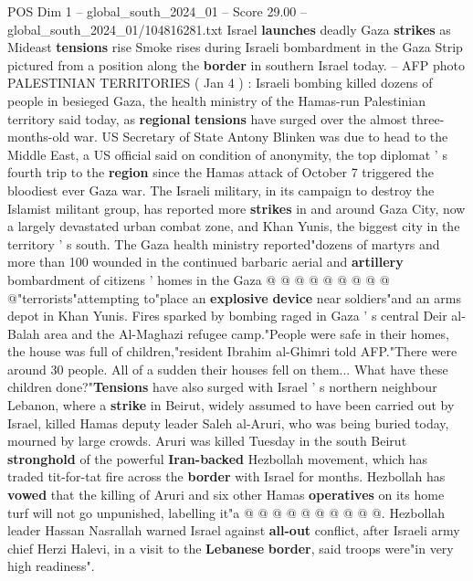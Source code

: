 \begin{textsample}{POS Dim 1 – global\_south\_2024\_01 – Score 29.00 – global\_south\_2024\_01/104816281.txt}  \label{ex:f1_pos_102}
Israel \textbf{launches} deadly Gaza \textbf{strikes} as Mideast \textbf{tensions} rise Smoke rises during Israeli bombardment in the Gaza Strip pictured from a position along the \textbf{border} in southern Israel today. -- AFP photo PALESTINIAN TERRITORIES ( Jan 4 ) : Israeli bombing killed dozens of people in besieged Gaza, the health ministry of the Hamas-run Palestinian territory said today, as \textbf{regional} \textbf{tensions} have surged over the almost three-months-old war.
US Secretary of State Antony Blinken was due to head to the Middle East, a US official said on condition of anonymity, the top diplomat ' s fourth trip to the \textbf{region} since the Hamas attack of October 7 triggered the bloodiest ever Gaza war.
The Israeli military, in its campaign to destroy the Islamist militant group, has reported more \textbf{strikes} in and around Gaza City, now a largely devastated urban combat zone, and Khan Yunis, the biggest city in the territory ' s south.
The Gaza health ministry reported"dozens of martyrs and more than 100 wounded in the continued barbaric aerial and \textbf{artillery} bombardment of citizens ' homes in the Gaza @ @ @ @ @ @ @ @ @ @"terrorists"attempting to"place an \textbf{explosive} \textbf{device} near soldiers"and an arms depot in Khan Yunis.
Fires sparked by bombing raged in Gaza ' s central Deir al-Balah area and the Al-Maghazi refugee camp."People were safe in their homes, the house was full of children,"resident Ibrahim al-Ghimri told AFP."There were around 30 people.
All of a sudden their houses fell on them...
What have these children done?"\textbf{Tensions} have also surged with Israel ' s northern neighbour Lebanon, where a \textbf{strike} in Beirut, widely assumed to have been carried out by Israel, killed Hamas deputy leader Saleh al-Aruri, who was being buried today, mourned by large crowds.
Aruri was killed Tuesday in the south Beirut \textbf{stronghold} of the powerful \textbf{Iran-backed} Hezbollah movement, which has traded tit-for-tat fire across the \textbf{border} with Israel for months.
Hezbollah has \textbf{vowed} that the killing of Aruri and six other Hamas \textbf{operatives} on its home turf will not go unpunished, labelling it"a @ @ @ @ @ @ @ @ @ @.
Hezbollah leader Hassan Nasrallah warned Israel against \textbf{all-out} conflict, after Israeli army chief Herzi Halevi, in a visit to the \textbf{Lebanese} \textbf{border}, said troops were"in very high readiness".

\end{textsample}
